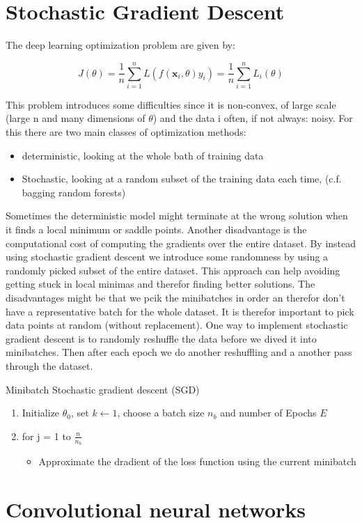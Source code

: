 
\section{Stochastic Gradient Descent}
The deep learning optimization problem are given by:

	\begin{equation}
		J(\theta) = \frac{1} {n} \sum_{i=1}^{n}L(f(\textbf{x}_i, \theta)y_i) = \frac{1} {n} \sum_{i=1}^{n}L_i(\theta)
	\end{equation}

This problem introduces some difficulties since it is non-convex, of large scale (large n and many dimensions of $\theta$) and the data i often, if not always: noisy. For this there are two main classes of optimization methods:

\begin{itemize}
 	\item deterministic, looking at the whole bath of training data
 	\item Stochastic, looking at a random subset of the training data each time, (c.f. bagging random forests)
 \end{itemize} 

 Sometimes the deterministic model might terminate at the wrong solution when it finds a local minimum or saddle points. Another disadvantage is the computational cost of computing the gradients over the entire dataset. By instead using stochastic gradient descent we introduce some randomness by using a randomly picked subset of the entire dataset. This approach can help avoiding getting stuck in local minimas and therefor finding better solutions. The disadvantages might be that we pcik the minibatches in order an therefor don't have a representative batch for the whole dataset. It is therefor important to pick data points at random (without replacement). One way to implement stochastic gradient descent is to randomly reshuffle the data before we dived it into minibatches. Then after each epoch we do another reshuffling and a another pass through the dataset. 


\begin{wbox}{Minibatch Stochastic gradient descent (SGD)}
	\begin{enumerate}
		\item Initialize $\theta_0$, set $k \leftarrow 1$, choose a batch size $n_b$ and number of Epochs $E$
		\item for j = 1 to $\frac{n} {n_b}$
		\begin{itemize}
			\item Approximate the dradient of the loss function using the current minibatch
		\end{itemize}
	\end{enumerate}
\end{wbox}



\section{Convolutional neural networks}


